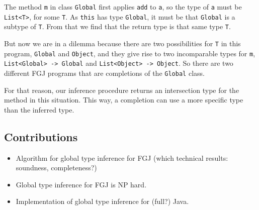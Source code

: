 The method \texttt{m} in class \texttt{Global} first applies
\texttt{add} to \texttt{a}, so the type of \texttt{a} must be
\lstinline{List<T>}, for some \lstinline{T}. As \lstinline{this} has
type \lstinline{Global}, it must be that \lstinline{Global} is a
subtype of \lstinline{T}. From that we find that the return type is
that same type \lstinline{T}.

But now we are in a dilemma because there are two possibilities for
\lstinline{T} in this program, \lstinline{Global} and
\lstinline{Object}, and they give rise to two incomparable types for
\lstinline{m}, \lstinline{List<Global> -> Global} and
\lstinline{List<Object> -> Object}. So there are two different FGJ
programs that are completions of the \lstinline{Global} class.

For that reason, our inference procedure returns an intersection type
for the method in this situation. This way, a completion can use a
more specific type than the inferred type.

\subsection{Contributions}
\label{sec:contributions}

\begin{itemize}
\item Algorithm for global type inference for FGJ (which technical 
  results: soundness, completeness?)
\item Global type inference for FGJ is NP hard.
\item Implementation of global type inference for (full?) Java.
\end{itemize}


